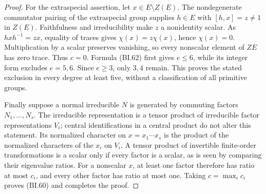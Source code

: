 \begin{proof}
For the extraspecial assertion, let $x\in E\setminus Z(E)$.
The nondegenerate commutator pairing of the extraspecial group
supplies $h\in E$ with $[h,x]=z\ne1$ in $Z(E)$.
Faithfulness and irreducibility make $z$ a nonidentity scalar.
As $hxh^{-1}=zx$, equality of traces gives
$\chi(x)=z\chi(x)$, hence $\chi(x)=0$.  Multiplication by a scalar
preserves vanishing, so every nonscalar element of $ZE$ has zero
trace.  Thus $c=0$.  Formula (BI.62) first gives $e\le6$, while
its integer form excludes $e=5,6$.  Since $e\ge3$, only $3,4$
remain.  This proves the stated exclusion in every degree at
least five, without a classification of all primitive groups.

Finally suppose a normal irreducible $N$ is generated by commuting
factors $N_1,\ldots,N_s$.  The irreducible representation is a
tensor product of irreducible factor representations $V_i$;
central identifications in a central product do not alter this
statement.  Its normalized character on $x=x_1\cdots x_s$ is
the product of the normalized characters of the $x_i$ on $V_i$.
A tensor product of invertible finite-order transformations is a
scalar only if every factor is a scalar, as is seen by comparing
their eigenvalue ratios.  For a nonscalar $x$, at least one
factor therefore has ratio at most $c_i$, and every other factor
has ratio at most one.  Taking $c=\max_i c_i$ proves (BI.60)
and completes the proof.
\end{proof}

